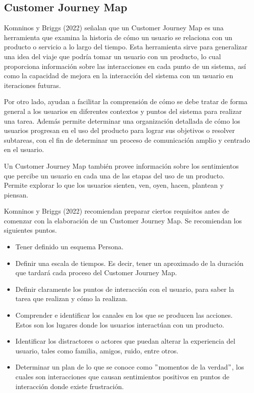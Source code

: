 
\subsection{Customer Journey Map}
\label{CustomerJourneyMapCap3}

Komninos y Briggs (2022) señalan que un Customer Journey Map es una herramienta que examina la historia de cómo un usuario se relaciona con un producto o servicio a lo largo del tiempo. Esta herramienta sirve para generalizar una idea del viaje que podría tomar un usuario con un producto, lo cual proporciona información sobre las interacciones en cada punto de un sistema, así como la capacidad de mejora en la interacción del sistema con un usuario en iteraciones futuras.

Por otro lado, ayudan a facilitar la comprensión de cómo se debe tratar de forma general a los usuarios en diferentes contextos y puntos del sistema para realizar una tarea. Además permite determinar una organización detallada de cómo los usuarios progresan en el uso del producto para lograr sus objetivos o resolver subtareas, con el fin de determinar un proceso de comunicación amplio y centrado en el usuario.

Un Customer Journey Map también provee información sobre los sentimientos que percibe un usuario en cada una de las etapas del uso de un producto. Permite explorar lo que los usuarios sienten, ven, oyen, hacen, plantean y piensan.

Komninos y Briggs (2022) recomiendan preparar ciertos requisitos antes de comenzar con la elaboración de un Customer Journey Map. Se recomiendan los siguientes puntos.

\begin{itemize}
  \item Tener definido un esquema Persona.
  \item Definir una escala de tiempos. Es decir, tener un aproximado de la duración que tardará cada proceso del Customer Journey Map.
  \item Definir claramente los puntos de interacción con el usuario, para saber la tarea que realizan y cómo la realizan.
  \item Comprender e identificar los canales en los que se producen las acciones. Estos son los lugares donde los usuarios interactúan con un producto.
  \item Identificar los distractores o actores que puedan alterar la experiencia del usuario, tales como familia, amigos, ruido, entre otros.
  \item Determinar un plan de lo que se conoce como $"$momentos de la verdad$"$, los cuales son interacciones que causan sentimientos positivos en puntos de interacción donde existe frustración.
\end{itemize}

